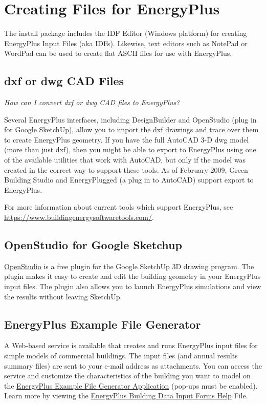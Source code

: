 \section{Creating Files for EnergyPlus}\label{creating-files-for-energyplus}

The install package includes the IDF Editor (Windows platform) for creating EnergyPlus Input Files (aka IDFs). Likewise, text editors such as NotePad or WordPad can be used to create flat ASCII files for use with EnergyPlus.

\subsection{dxf or dwg CAD Files}\label{dxf-or-dwg-cad-files}

\emph{How can I convert dxf or dwg CAD files to EnergyPlus?}

Several EnergyPlus interfaces, including DesignBuilder and OpenStudio (plug in for Google SketchUp), allow you to import the dxf drawings and trace over them to create EnergyPlus geometry. If you have the full AutoCAD 3-D dwg model (more than just dxf), then you might be able to export to EnergyPlus using one of the available utilities that work with AutoCAD, but only if the model was created in the correct way to support these tools. As of February 2009, Green Building Studio and EnergyPlugged (a plug in to AutoCAD) support export to EnergyPlus.

For more information about current tools which support EnergyPlus, see \url{https://www.buildingenergysoftwaretools.com/}.

\subsection{OpenStudio for Google Sketchup}\label{openstudio-for-google-sketchup}

\href{http://apps1.eere.energy.gov/buildings/energyplus/openstudio.cfm}{OpenStudio} is a free plugin for the Google SketchUp 3D drawing program. The plugin makes it easy to create and edit the building geometry in your EnergyPlus input files. The plugin also allows you to launch EnergyPlus simulations and view the results without leaving SketchUp.

\subsection{EnergyPlus Example File Generator}\label{energyplus-example-file-generator}

A Web-based service is available that creates and runs EnergyPlus input files for simple models of commercial buildings. The input files (and annual results summary files) are sent to your e-mail address as attachments. You can access the service and customize the characteristics of the building you want to model on the \href{http://apps1.eere.energy.gov/buildings/energyplus/cfm/inputs/}{EnergyPlus Example File Generator Application} (pop-ups must be enabled). Learn more by viewing the \href{http://apps1.eere.energy.gov/buildings/energyplus/cfm/inputs/help.cfm}{EnergyPlus Building Data Input Forms Help} File.
